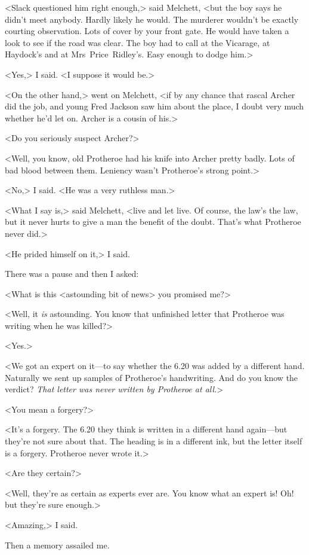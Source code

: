 <Slack questioned him right enough,> said Melchett, <but the boy says he didn't meet anybody. Hardly likely he would. The murderer wouldn't be exactly courting observation. Lots of cover by your front gate. He would have taken a look to see if the road was clear. The boy had to call at the Vicarage, at Haydock's and at Mrs~Price~Ridley's. Easy enough to dodge him.>

<Yes,> I said. <I suppose it would be.>

<On the other hand,> went on Melchett, <if by any chance that rascal Archer did the job, and young Fred Jackson saw him about the place, I doubt very much whether he'd let on. Archer is a cousin of his.>

<Do you seriously suspect Archer?>

<Well, you know, old Protheroe had his knife into Archer pretty badly. Lots of bad blood between them. Leniency wasn't Protheroe's strong point.>

<No,> I said. <He was a very ruthless man.>

<What I say is,> said Melchett, <live and let live. Of course, the law's the law, but it never hurts to give a man the benefit of the doubt. That's what Protheroe never did.>

<He prided himself on it,> I said.

There was a pause and then I asked:

<What is this <astounding bit of news> you promised me?>

<Well, it \emph{is} astounding. You know that unfinished letter that Protheroe was writing when he was killed?>

<Yes.>

<We got an expert on it—to say whether the 6.20 was added by a different hand. Naturally we sent up samples of Protheroe's handwriting. And do you know the verdict? \emph{That letter was never written by Protheroe at all.}>

<You mean a forgery?>

<It's a forgery. The 6.20 they think is written in a different hand again—but they're not sure about that. The heading is in a different ink, but the letter itself is a forgery. Protheroe never wrote it.>

<Are they certain?>

<Well, they're as certain as experts ever are. You know what an expert is! Oh! but they're sure enough.>

<Amazing,> I said.

Then a memory assailed me.

